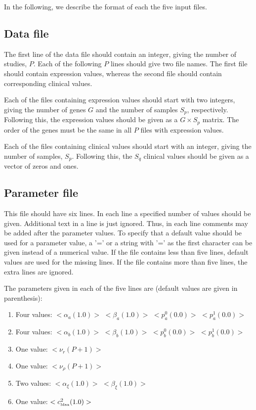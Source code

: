 \documentclass[11pt]{article}
\begin{document}
In the following, we describe the format of each the five input files.
\subsection{Data file}
The first line of the data file should contain an integer, giving the number of studies, $P$.
Each of the following $P$ lines should give 
two file names. The first file should contain expression values, 
whereas the second file should contain corresponding clinical values. 

Each of the files containing expression values should start with two integers, giving the number of
genes $G$ and the number of samples $S_p$, respectively. Following this, the expression values should
be given as a $G\times S_p$ matrix. The order of the genes must be the same in all $P$ files 
with expression values.

Each of the files containing clinical values should start with an integer, giving the 
number of samples, $S_p$. Following this, the $S_q$ clinical values should be given as a
vector of zeros and ones.

\subsection{\label{parameterfile}Parameter file}
This file should have six lines. In each line a specified number of values should be given.
Additional text in a line is just ignored. Thus, in each line comments may be 
added after the parameter values. To specify that a default value should be used
for a parameter value, a '=' or a string with '=' as the first character can be 
given instead of a numerical value. If the file contains less than five lines,
default values are used for the missing lines. If the file contains more than 
five lines, the extra lines are ignored.

The parameters given in each of the five lines are (default values are given in parenthesis):
\begin{enumerate}
\item Four values: $<\alpha_a (1.0)>$ $<\beta_a (1.0)>$ $<p_a^0 (0.0)>$ $<p_a^1 (0.0)>$
\item Four values: $<\alpha_b (1.0)>$ $<\beta_b (1.0)>$ $<p_b^0 (0.0)>$ $<p_b^1 (0.0)>$
\item One value: $<\nu_r (P+1)>$
\item One value: $<\nu_\rho (P+1)>$
\item Two values: $<\alpha_\xi (1.0)>$ $<\beta_\xi (1.0)>$
\item One value: $<c^2_{\mbox{\tiny{Max}}} (1.0)>$ 
\end{enumerate}
\end{document}
